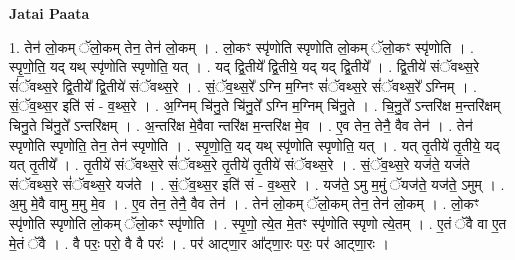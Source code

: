 \documentclass[17pt]{extarticle}
\begin{document}
\textbf{Jatai Paata} \newline

1. तेन॑ लो॒कम् ॅलो॒कम् तेन॒ तेन॑ लो॒कम् । . लो॒कꣳ स्पृ॑णोति स्पृणोति लो॒कम् ॅलो॒कꣳ स्पृ॑णोति । . स्पृ॒णो॒ति॒ यद् यथ् स्पृ॑णोति स्पृणोति॒ यत् । . यद् द्वि॒तीये᳚ द्वि॒तीये॒ यद् यद् द्वि॒तीये᳚ । . द्वि॒तीये॑ संॅवथ्स॒रे सं॑ॅवथ्स॒रे द्वि॒तीये᳚ द्वि॒तीये॑ संॅवथ्स॒रे । . सं॒ॅव॒थ्स॒रे᳚ ऽग्नि म॒ग्निꣳ सं॑ॅवथ्स॒रे सं॑ॅवथ्स॒रे᳚ ऽग्निम् । . सं॒ॅव॒थ्स॒र इति॑ सं - व॒थ्स॒रे । . अ॒ग्निम् चि॑नु॒ते चि॑नु॒ते᳚ ऽग्नि म॒ग्निम् चि॑नु॒ते । . चि॒नु॒ते᳚ ऽन्तरि॑क्ष म॒न्तरि॑क्षम् चिनु॒ते चि॑नु॒ते᳚ ऽन्तरि॑क्षम् । . अ॒न्तरि॑क्ष मे॒वैवा न्तरि॑क्ष म॒न्तरि॑क्ष मे॒व । . ए॒व तेन॒ तेनै॒ वैव तेन॑ । . तेन॑ स्पृणोति स्पृणोति॒ तेन॒ तेन॑ स्पृणोति । . स्पृ॒णो॒ति॒ यद् यथ् स्पृ॑णोति स्पृणोति॒ यत् । . यत् तृ॒तीये॑ तृ॒तीये॒ यद् यत् तृ॒तीये᳚ । . तृ॒तीये॑ संॅवथ्स॒रे सं॑ॅवथ्स॒रे तृ॒तीये॑ तृ॒तीये॑ संॅवथ्स॒रे । . सं॒ॅव॒थ्स॒रे यज॑ते॒ यज॑ते संॅवथ्स॒रे सं॑ॅवथ्स॒रे यज॑ते । . सं॒ॅव॒थ्स॒र इति॑ सं - व॒थ्स॒रे । . यज॑ते॒ ऽमु म॒मुं ॅयज॑ते॒ यज॑ते॒ ऽमुम् । . अ॒मु मे॒वै वामु म॒मु मे॒व । . ए॒व तेन॒ तेनै॒ वैव तेन॑ । . तेन॑ लो॒कम् ॅलो॒कम् तेन॒ तेन॑ लो॒कम् । . लो॒कꣳ स्पृ॑णोति स्पृणोति लो॒कम् ॅलो॒कꣳ स्पृ॑णोति । . स्पृ॒णो॒ त्ये॒त मे॒तꣳ स्पृ॑णोति स्पृणो त्ये॒तम् । . ए॒तं ॅवै वा ए॒त मे॒तं ॅवै । . वै परः॒ परो॒ वै वै परः॑ । . पर॑ आट्णा॒र आ᳚ट्णा॒रः परः॒ पर॑ आट्णा॒रः । \newline
\end{document}
